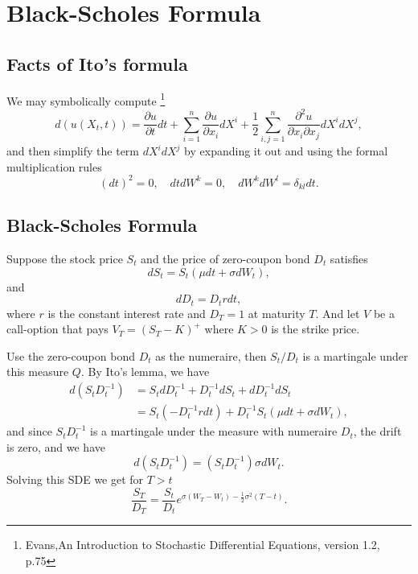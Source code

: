 \chapter{Black-Scholes Formula}

\section{Facts of Ito's formula}

We may symbolically compute
\footnote{Evans,An Introduction to Stochastic Differential Equations,
          version 1.2, p.75}
\begin{equation}
  d(u(X_t,t)) = \frac{\partial u}{\partial t} dt
               + \sum_{i=1}^{n} \frac{\partial u}{\partial x_i} dX^i
               + \frac{1}{2} \sum_{i,j=1}^n 
                   \frac{\partial^2 u}{\partial x_i \partial x_j} dX^i dX^j,
\end{equation}
and then simplify the term $dX^i dX^j$ by expanding it out and using the 
formal multiplication rules
\[
  (dt)^2=0, \quad dt dW^k=0, \quad dW^k dW^l=\delta_{kl} dt.
\]


\section{Black-Scholes Formula}

Suppose the stock price $S_t$ and the price of zero-coupon bond $D_t$ satisfies
\[
  dS_t = S_t (\mu dt + \sigma dW_t),
\]
and 
\[
  dD_t = D_t r dt,
\]
where $r$ is the constant interest rate and $D_T=1$ at maturity $T$.
And let $V$ be a call-option that pays $V_T=(S_T-K)^+$ where $K>0$ is the 
strike price. 

Use the zero-coupon bond $D_t$ as the numeraire, then $S_t/D_t$ is a martingale
under this measure $Q$. By Ito's lemma, we have
\begin{align*}
  d(S_t D_t^{-1}) &= S_t dD_t^{-1} + D_t^{-1} dS_t + dD_t^{-1} dS_t \\
                  &= S_t (-D_t^{-1} rdt) + D_t^{-1} S_t (\mu dt + \sigma dW_t),
\end{align*}
and since $S_t D_t^{-1}$ is a martingale under the measure with numeraire 
$D_t$, the drift is zero, and we have
\[
  d(S_t D_t^{-1}) = (S_t D_t^{-1}) \sigma dW_t.
\]
Solving this SDE we get for $T>t$
\[
  \frac{S_T}{D_T} = \frac{S_t}{D_t} 
                    e^{\sigma (W_T-W_t) - \frac{1}{2}\sigma^2 (T-t)}.
\]

